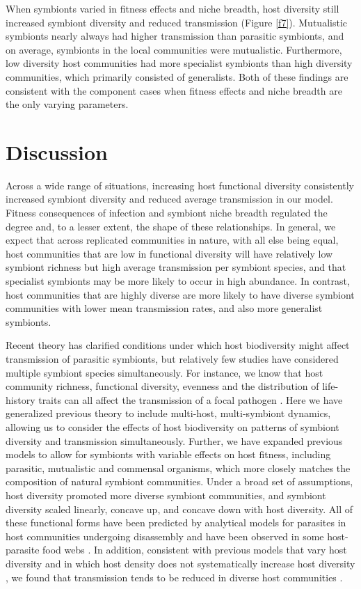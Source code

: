 When symbionts varied in fitness effects and niche breadth, host diversity still increased symbiont diversity and reduced transmission (Figure \ref{f7}).
Mutualistic symbionts nearly always had higher transmission than parasitic symbionts, and on average, symbionts in the local communities were mutualistic.
Furthermore, low diversity host communities had more specialist symbionts than high diversity communities, which primarily consisted of generalists.
Both of these findings are consistent with the component cases when fitness effects and niche breadth are the only varying parameters.

\section{Discussion}

Across a wide range of situations, increasing host functional diversity consistently increased symbiont diversity and reduced average transmission in our model.
Fitness consequences of infection and symbiont niche breadth regulated the degree and, to a lesser extent, the shape of these relationships.
In general, we expect that across replicated communities in nature, with all else being equal, host communities that are low in functional diversity will have relatively low symbiont richness but high average transmission per symbiont species, and that specialist symbionts may be more likely to occur in high abundance.
In contrast, host communities that are highly diverse are more likely to have diverse symbiont communities with lower mean transmission rates, and also more generalist symbionts.

Recent theory has clarified conditions under which host biodiversity might affect transmission of parasitic symbionts, but relatively few studies have considered multiple symbiont species simultaneously.
For instance, we know that host community richness, functional diversity, evenness and the distribution of life-history traits can all affect the transmission of a focal pathogen \citep{Dobson2004, Rudolf2005, Roche2012, Joseph2013a, Mihaljevic2014, Chen2015, ORegan2015a}.
Here we have generalized previous theory to include multi-host, multi-symbiont dynamics, allowing us to consider the effects of host biodiversity on patterns of symbiont diversity and transmission simultaneously.
Further, we have expanded previous models to allow for symbionts with variable effects on host fitness, including parasitic, mutualistic and commensal organisms, which more closely matches the composition of natural symbiont communities.
Under a broad set of assumptions, host diversity promoted more diverse symbiont communities, and symbiont diversity scaled linearly, concave up, and concave down with host diversity.
All of these functional forms have been predicted by analytical models for parasites in host communities undergoing disassembly and have been observed in some host-parasite food webs \cite{Lafferty2012}.
In addition, consistent with previous models that vary host diversity and in which host density does not systematically increase host diversity \citep{Mihaljevic2014}, we found that transmission tends to be reduced in diverse host communities \citep{Dobson2004, Rudolf2005, Roche2012, Joseph2013a, Mihaljevic2014}.

